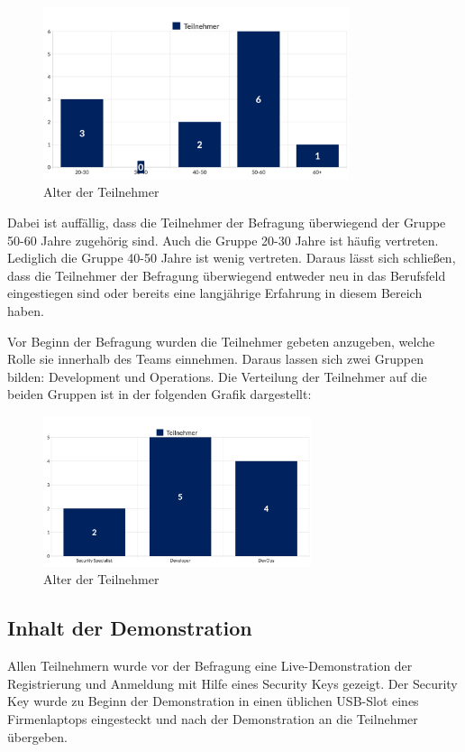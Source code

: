 \begin{figure}[h]
	\centering 
	\includegraphics[width=0.8\textwidth]{img/abbildungen/chart-2.png}
	\captionsetup{format=hang}
	\caption{Alter der Teilnehmer}
\end{figure}

Dabei ist auffällig, dass die Teilnehmer der Befragung überwiegend der Gruppe 50-60 Jahre zugehörig sind. Auch die Gruppe 20-30 Jahre ist häufig vertreten. Lediglich die Gruppe 40-50 Jahre ist wenig vertreten. Daraus lässt sich schließen, dass die Teilnehmer der Befragung überwiegend entweder neu in das Berufsfeld eingestiegen sind oder bereits eine langjährige Erfahrung in diesem Bereich haben. 

Vor Beginn der Befragung wurden die Teilnehmer gebeten anzugeben, welche Rolle sie innerhalb des Teams einnehmen. Daraus lassen sich zwei Gruppen bilden: Development und Operations. Die Verteilung der Teilnehmer auf die beiden Gruppen ist in der folgenden Grafik dargestellt:

\begin{figure}[h]
	\centering 
	\includegraphics[width=0.7\textwidth]{img/abbildungen/chart_rollen.png}
	\captionsetup{format=hang}
	\caption{Alter der Teilnehmer}
\end{figure}

\subsection{Inhalt der Demonstration}
Allen Teilnehmern wurde vor der Befragung eine Live-Demonstration der Registrierung und Anmeldung mit Hilfe eines Security Keys gezeigt. Der Security Key wurde zu Beginn der Demonstration in einen üblichen USB-Slot eines Firmenlaptops eingesteckt und nach der Demonstration an die Teilnehmer übergeben. 

